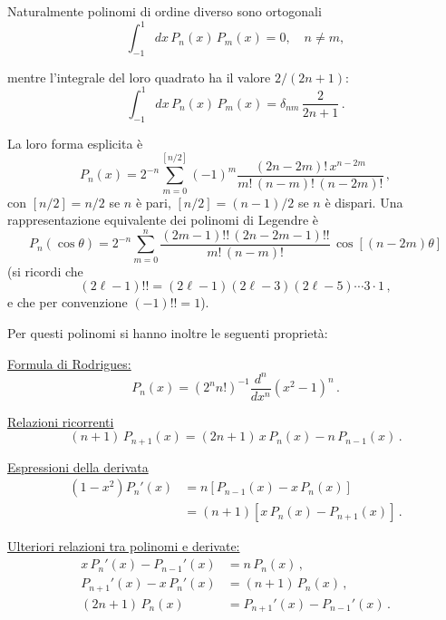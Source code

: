 \documentclass[11pt, a4paper]{book}
\numberwithin{equation}{section}
\begin{document}
Naturalmente polinomi di ordine diverso sono ortogonali
\begin{equation}
\int_{-1}^{1} dx\, P_n(x)\, P_m(x) = 0, \quad n \neq m, \tag{21}
\end{equation}


mentre l'integrale del loro quadrato ha il valore $2/(2n+1)$:
\begin{equation}
\int_{-1}^{1} dx\, P_n(x)\, P_m(x) = \delta_{nm}\, \frac{2}{2n+1} \,. \tag{22}
\end{equation}

La loro forma esplicita è
\begin{equation}
P_n(x) = 2^{-n} \sum_{m=0}^{[n/2]} (-1)^m \frac{(2n-2m)!\, x^{n-2m}}{m!\,(n-m)!\,(n-2m)!} \,, \tag{23}
\end{equation}
con $[n/2] = n/2$ se $n$ è pari, $[n/2] = (n-1)/2$
se $n$ è dispari. Una rappresentazione equivalente dei polinomi di Legendre è
\begin{equation}
P_n(\cos\theta) = 2^{-n} \sum_{m=0}^{n} \frac{(2m-1)!!\,(2n-2m-1)!!}{m!\,(n-m)!}\, \cos[(n-2m)\theta] \tag{24}
\end{equation}
(si ricordi che
\[
(2\ell-1)!! = (2\ell-1)(2\ell-3)(2\ell-5)\cdots 3 \cdot 1 \,,
\]
e che per convenzione $(-1)!! = 1$).

Per questi polinomi si hanno inoltre le seguenti proprietà:

\medskip
\noindent\underline{Formula di Rodrigues:}
\begin{equation}
P_n(x) = \left(2^n n!\right)^{-1} \frac{d^n}{dx^n} \left(x^2 - 1\right)^n \,. \tag{25}
\end{equation}

\medskip
\noindent\underline{Relazioni ricorrenti}
\begin{equation}
(n+1)\, P_{n+1}(x) = (2n+1)\, x\, P_n(x) - n\, P_{n-1}(x) \,. \tag{26}
\end{equation}

\medskip
\noindent\underline{Espressioni della derivata}
\begin{align}
(1-x^2) P_n'(x) &= n\left[P_{n-1}(x) - x\, P_n(x)\right] \tag{27a} \\
&= (n+1)\left[x\, P_n(x) - P_{n+1}(x)\right] \,. \tag{27b}
\end{align}


\medskip
\noindent\underline{Ulteriori relazioni tra polinomi e derivate:}
\begin{align}
x\, P_n'(x) - P_{n-1}'(x) &= n\, P_n(x) \,, \tag{28a} \\
P_{n+1}'(x) - x\, P_n'(x) &= (n+1)\, P_n(x) \,, \tag{28b} \\
(2n+1)\, P_n(x) &= P_{n+1}'(x) - P_{n-1}'(x) \,. \tag{28c}
\end{align}
\end{document}
